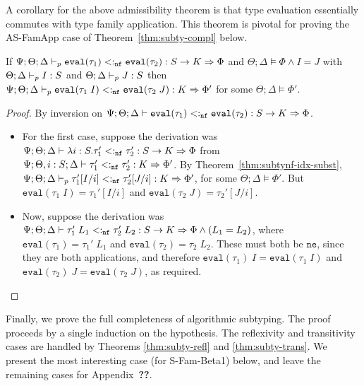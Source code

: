 A corollary for the above admissibility theorem is that type evaluation essentially commutes with type family application. This theorem is pivotal for proving the AS-FamApp case of Theorem~\ref{thm:subty-compl} below.

\begin{theorem}
If $\Psi ; \Theta ; \Delta \vdash_p \texttt{eval}(\tau_1) <:_{\texttt{nf}} \texttt{eval}(\tau_2) : S \to K \Rightarrow \Phi$ and $\Theta ; \Delta \vDash \Phi \wedge I = J$ with $\Theta ; \Delta \vdash_p I : S$ and $\Theta ; \Delta \vdash_p J : S$ then 
$\Psi ; \Theta ; \Delta \vdash_p \texttt{eval}(\tau_1 \; I) <:_{\texttt{nf}} \texttt{eval}(\tau_2 \; J) : K \Rightarrow \Phi'$ for some $\Theta ; \Delta \vDash \Phi'$.
\label{thm:eval-app-lemma}
\end{theorem}
\begin{proof}
By inversion on $\Psi ; \Theta ; \Delta \vdash \texttt{eval}(\tau_1) <:_{\texttt{nf}} \texttt{eval}(\tau_2) : S \to K \Rightarrow \Phi$.
\begin{itemize}
  \item For the first case, suppose the derivation was $\Psi ; \Theta ; \Delta \vdash \lambda i : S. \tau_1' <:_{\texttt{nf}} \tau_2' : S \to K \Rightarrow \Phi$
  from $\Psi ; \Theta, i : S ; \Delta \vdash \tau_1' <:_{\texttt{nf}} \tau_2' : K \Rightarrow \Phi'$. By Theorem~\ref{thm:subtynf-idx-subst},
  $\Psi ; \Theta ; \Delta \vdash_p \tau_1'[I/i] <:_{\texttt{nf}} \tau_2'[J/i] : K \Rightarrow \Phi'$, for some $\Theta ; \Delta \vDash \Phi'$. But $\texttt{eval}(\tau_1 \; I) = \tau_1'[I/i]$ and $\texttt{eval}(\tau_2 \; J) = \tau_2'[J/i]$.
  \item Now, suppose the derivation was $\Psi ; \Theta ; \Delta \vdash \tau_1' \; L_1 <:_{\texttt{nf}} \tau_2' \; L_2 : S \to K \Rightarrow \Phi \wedge (L_1 = L_2)$, where $\texttt{eval}(\tau_1) = \tau_1' \; L_1$ and $\texttt{eval}(\tau_2) = \tau_2 \; L_2$. These must both be $\texttt{ne}$, since they are both applications, and therefore
  $\texttt{eval}(\tau_1) \; I = \texttt{eval}(\tau_1 \; I)$ and $\texttt{eval}(\tau_2) \; J = \texttt{eval}(\tau_2 \; J)$, as required.
\end{itemize}
\end{proof}

Finally, we prove the full completeness of algorithmic subtyping. The proof proceeds by a single induction on the hypothesis. The reflexivity and transitivity cases are handled by Theorems \ref{thm:subty-refl} and \ref{thm:subty-trans}. We present the most interesting case (for S-Fam-Beta1) below, and leave the remaining cases for Appendix~\textbf{??}.

